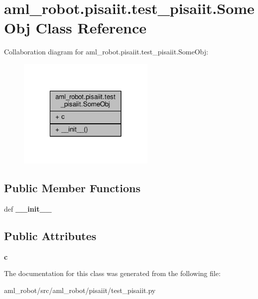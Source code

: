 \hypertarget{classaml__robot_1_1pisaiit_1_1test__pisaiit_1_1_some_obj}{\section{aml\-\_\-robot.\-pisaiit.\-test\-\_\-pisaiit.\-Some\-Obj Class Reference}
\label{classaml__robot_1_1pisaiit_1_1test__pisaiit_1_1_some_obj}
}


Collaboration diagram for aml\-\_\-robot.\-pisaiit.\-test\-\_\-pisaiit.\-Some\-Obj\-:
\nopagebreak
\begin{figure}[H]
\begin{center}
\leavevmode
\includegraphics[width=186pt]{classaml__robot_1_1pisaiit_1_1test__pisaiit_1_1_some_obj__coll__graph}
\end{center}
\end{figure}
\subsection*{Public Member Functions}
\begin{DoxyCompactItemize}
\item 
\hypertarget{classaml__robot_1_1pisaiit_1_1test__pisaiit_1_1_some_obj_acd4fd77d29ebfa921f83b4171c9a879b}{def {\bfseries \-\_\-\-\_\-init\-\_\-\-\_\-}}\label{classaml__robot_1_1pisaiit_1_1test__pisaiit_1_1_some_obj_acd4fd77d29ebfa921f83b4171c9a879b}

\end{DoxyCompactItemize}
\subsection*{Public Attributes}
\begin{DoxyCompactItemize}
\item 
\hypertarget{classaml__robot_1_1pisaiit_1_1test__pisaiit_1_1_some_obj_a45a326505628287711c5a0deb8bc9c69}{{\bfseries c}}\label{classaml__robot_1_1pisaiit_1_1test__pisaiit_1_1_some_obj_a45a326505628287711c5a0deb8bc9c69}

\end{DoxyCompactItemize}


The documentation for this class was generated from the following file\-:\begin{DoxyCompactItemize}
\item 
aml\-\_\-robot/src/aml\-\_\-robot/pisaiit/test\-\_\-pisaiit.\-py\end{DoxyCompactItemize}
